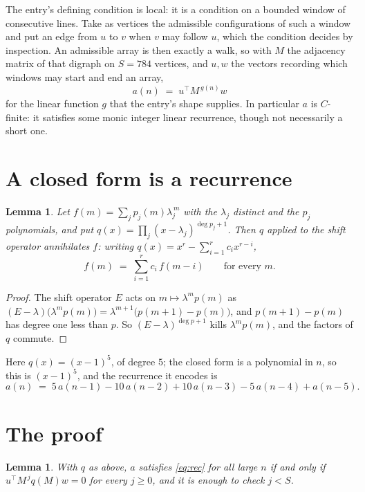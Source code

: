 \documentclass[11pt,a4paper]{article}
\theoremstyle{plain}
\newtheorem{lemma}[theorem]{Lemma}
\theoremstyle{definition}
\begin{document}
The entry's defining condition is local: it is a condition on a bounded window of consecutive lines. Take as vertices the
admissible configurations of such a window and put an edge from $u$ to $v$ when $v$ may
follow $u$, which the condition decides by inspection. An admissible array is then exactly a
walk, so with $M$ the adjacency matrix of that digraph on $S=784$ vertices, and $u,w$ the
vectors recording which windows may start and end an array,
\[
a(n)\;=\;u^{\!\top}M^{\,g(n)}w
\]
for the linear function $g$ that the entry's shape supplies. In particular $a$ is
$C$-finite: it satisfies some monic integer linear recurrence, though not necessarily a short
one.

\section{A closed form is a recurrence}

\begin{lemma}\label{lem:ann}
Let $f(m)=\sum_{j}p_j(m)\lambda_j^{\,m}$ with the $\lambda_j$ distinct and the $p_j$
polynomials, and put $q(x)=\prod_j(x-\lambda_j)^{\deg p_j+1}$. Then $q$ applied to the shift
operator annihilates $f$: writing $q(x)=x^{r}-\sum_{i=1}^{r}c_ix^{r-i}$,
\[
f(m)\;=\;\sum_{i=1}^{r}c_i\,f(m-i)\qquad\text{for every }m.
\]
\end{lemma}

\begin{proof}
The shift operator $E$ acts on $m\mapsto\lambda^{m}p(m)$ as
$(E-\lambda)\bigl(\lambda^{m}p(m)\bigr)=\lambda^{m+1}\bigl(p(m+1)-p(m)\bigr)$, and
$p(m+1)-p(m)$ has degree one less than $p$. So $(E-\lambda)^{\deg p+1}$ kills
$\lambda^{m}p(m)$, and the factors of $q$ commute.
\end{proof}

Here $q(x)=(x-1)^{5}$, of degree $5$; the closed form is a polynomial in $n$, so this is $(x-1)^{5}$, and the recurrence it encodes is
\begin{equation}\label{eq:rec}
a(n)\;=\;5\,a(n-1) - 10\,a(n-2) + 10\,a(n-3) - 5\,a(n-4) + a(n-5).
\end{equation}

\section{The proof}

\begin{lemma}\label{lem:crit}
With $q$ as above, $a$ satisfies \eqref{eq:rec} for all large $n$ if and only if
$u^{\!\top}M^{\,j}q(M)w=0$ for every $j\ge0$, and it is enough to check $j<S$.
\end{lemma}
\end{document}
